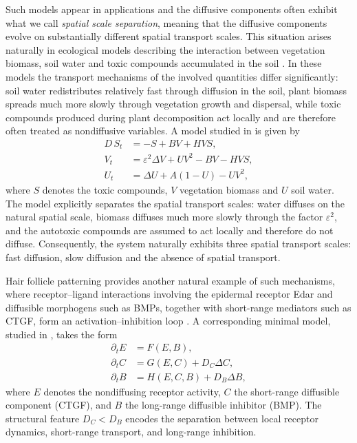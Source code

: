 \documentclass[12pt, a4paper]{amsart}
\numberwithin{equation}{section}
\begin{document}
Such models appear in applications and the diffusive components often exhibit what we call 
\textit{spatial scale separation}, meaning that the diffusive components evolve on 
substantially different spatial transport scales. This situation arises naturally in 
ecological models describing the interaction between vegetation biomass, soil water 
and toxic compounds accumulated in the soil \cite{marasco2014vegetation,Veerman2024_1}. In these 
models the transport mechanisms of the involved quantities differ significantly: soil 
water redistributes relatively fast through diffusion in the soil, plant biomass 
spreads much more slowly through vegetation growth and dispersal, while toxic 
compounds produced during plant decomposition act locally and are therefore often 
treated as nondiffusive variables. A model studied in \cite{Veerman2024_1} is given by
\begin{align}
D\,{ S_t} &= -S + B V + H V S , \\
 { V_t} &= \varepsilon^{2}\Delta V + U V^{2} - B V - H V S, \\
{ U_t} &= \Delta U + A(1-U) - U V^{2},
\end{align}
where $S$ denotes the toxic compounds, $V$ vegetation biomass and $U$ soil water. The 
model explicitly separates the spatial transport scales: water diffuses on the 
natural spatial scale, biomass diffuses much more slowly through the factor 
$\varepsilon^{2}$, and the autotoxic compounds are assumed to act locally and therefore 
do not diffuse. Consequently, 
the system naturally exhibits three spatial transport scales: fast diffusion, slow 
diffusion and the absence of spatial transport.


Hair follicle patterning provides another natural example of such mechanisms, where receptor--ligand interactions involving the epidermal receptor Edar and diffusible morphogens such as BMPs, together with short-range mediators such as CTGF, form an activation--inhibition loop \cite{mou2006generation}. A corresponding minimal model, studied in \cite{klika2012influence}, takes the form
\begin{align}
\partial_t E &= F(E,B), \\
\partial_t C &= G(E,C) + D_C \Delta C, \\
\partial_t B &= H(E,C,B) + D_B \Delta B,
\end{align}
where $E$ denotes the nondiffusing receptor activity, $C$ the short-range diffusible component (CTGF), and $B$ the long-range diffusible inhibitor (BMP). The structural feature $D_C < D_B$ encodes the separation between local receptor dynamics, short-range transport, and long-range inhibition.
\end{document}
